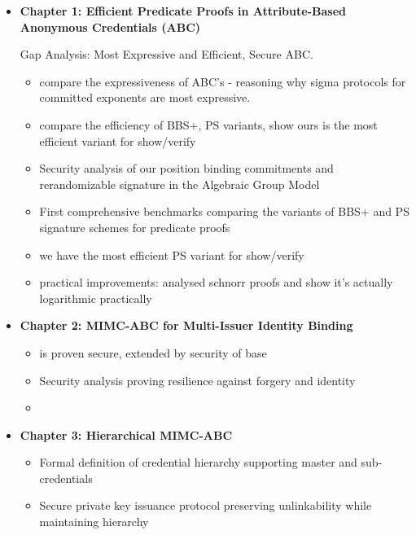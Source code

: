 \begin{itemize}
    \item \textbf{Chapter 1: Efficient Predicate Proofs in Attribute-Based Anonymous Credentials (ABC)}
    
    Gap Analysis: Most Expressive and Efficient, Secure ABC. 
    
    
    \begin{itemize}
        \item compare the expressiveness of ABC's - reasoning why sigma protocols for committed exponents are most expressive. 
        
        \item compare the efficiency of BBS+, PS variants, show ours is the most efficient variant for show/verify
    
        \item Security analysis of our position binding commitments and rerandomizable signature in the Algebraic Group Model
        
        \item First comprehensive benchmarks comparing the variants of BBS+ and PS signature schemes for predicate proofs

        \item we have the most efficient PS variant for show/verify
        
        \item practical improvements: analysed schnorr proofs and show it's actually logarithmic practically
        
    \end{itemize}

    \item \textbf{Chapter 2: MIMC-ABC for Multi-Issuer Identity Binding}
    \begin{itemize}
        \item is proven secure, extended by security of base
        \item Security analysis proving resilience against forgery and identity
        \item 
    \end{itemize}

    \item \textbf{Chapter 3: Hierarchical MIMC-ABC}
    \begin{itemize}
        \item Formal definition of credential hierarchy supporting master and sub-credentials
        \item Secure private key issuance protocol preserving unlinkability while maintaining hierarchy
    \end{itemize}


\end{itemize}
